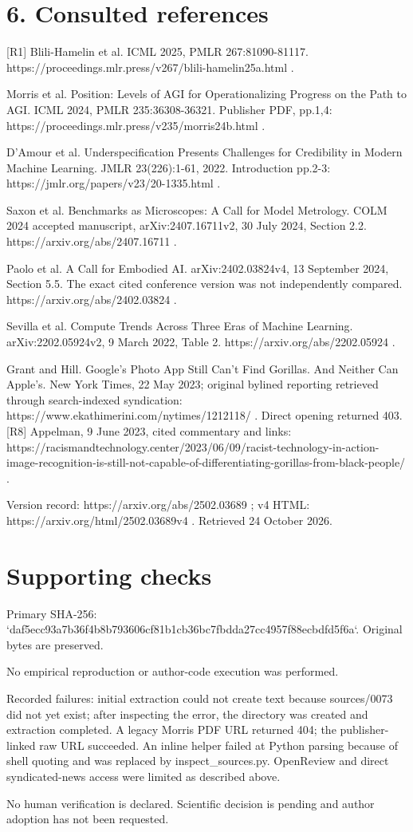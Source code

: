 \documentclass[10pt]{article}
\begin{document}
\section*{6. Consulted references}
[R1] Blili-Hamelin et al. ICML 2025, PMLR 267:81090-81117. https://proceedings.mlr.press/v267/blili-hamelin25a.html .\par
[R2] Morris et al. Position: Levels of AGI for Operationalizing Progress on the Path to AGI. ICML 2024, PMLR 235:36308-36321. Publisher PDF, pp.1,4: https://proceedings.mlr.press/v235/morris24b.html .\par
[R3] D’Amour et al. Underspecification Presents Challenges for Credibility in Modern Machine Learning. JMLR 23(226):1-61, 2022. Introduction pp.2-3: https://jmlr.org/papers/v23/20-1335.html .\par
[R4] Saxon et al. Benchmarks as Microscopes: A Call for Model Metrology. COLM 2024 accepted manuscript, arXiv:2407.16711v2, 30 July 2024, Section 2.2. https://arxiv.org/abs/2407.16711 .\par
[R5] Paolo et al. A Call for Embodied AI. arXiv:2402.03824v4, 13 September 2024, Section 5.5. The exact cited conference version was not independently compared. https://arxiv.org/abs/2402.03824 .\par
[R6] Sevilla et al. Compute Trends Across Three Eras of Machine Learning. arXiv:2202.05924v2, 9 March 2022, Table 2. https://arxiv.org/abs/2202.05924 .\par
[R7] Grant and Hill. Google’s Photo App Still Can’t Find Gorillas. And Neither Can Apple’s. New York Times, 22 May 2023; original bylined reporting retrieved through search-indexed syndication: https://www.ekathimerini.com/nytimes/1212118/ . Direct opening returned 403. [R8] Appelman, 9 June 2023, cited commentary and links: https://racismandtechnology.center/2023/06/09/racist-technology-in-action-image-recognition-is-still-not-capable-of-differentiating-gorillas-from-black-people/ .\par
[R9] Version record: https://arxiv.org/abs/2502.03689 ; v4 HTML: https://arxiv.org/html/2502.03689v4 . Retrieved 24 October 2026.\par
\section*{Supporting checks}
Primary SHA-256: `daf5ecc93a7b36f4b8b793606cf81b1cb36bc7fbdda27cc4957f88ecbdfd5f6a`. Original bytes are preserved.\par
No empirical reproduction or author-code execution was performed.\par
Recorded failures: initial extraction could not create text because sources/0073 did not yet exist; after inspecting the error, the directory was created and extraction completed. A legacy Morris PDF URL returned 404; the publisher-linked raw URL succeeded. An inline helper failed at Python parsing because of shell quoting and was replaced by inspect\_sources.py. OpenReview and direct syndicated-news access were limited as described above.\par
No human verification is declared. Scientific decision is pending and author adoption has not been requested.\par
\end{document}
